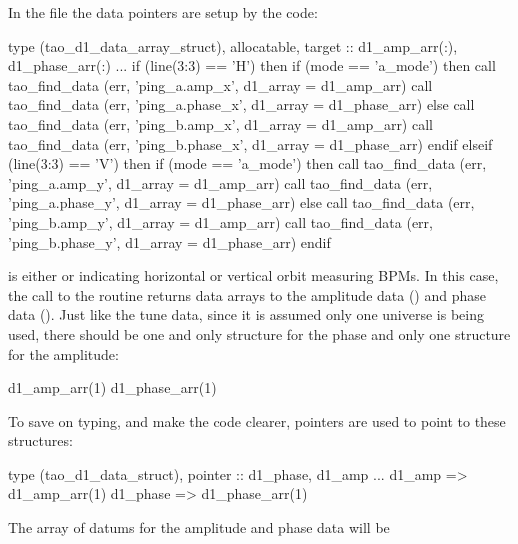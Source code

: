 {{{{{In the  file the data pointers are setup by the code:
\begin{example}
  type (tao_d1_data_array_struct), allocatable, target :: d1_amp_arr(:), d1_phase_arr(:)
  ...
  if (line(3:3) == 'H') then
    if (mode == 'a_mode') then
      call tao_find_data (err, 'ping_a.amp_x', d1_array = d1_amp_arr)
      call tao_find_data (err, 'ping_a.phase_x', d1_array = d1_phase_arr)
    else 
      call tao_find_data (err, 'ping_b.amp_x', d1_array = d1_amp_arr)
      call tao_find_data (err, 'ping_b.phase_x', d1_array = d1_phase_arr)
    endif
  elseif (line(3:3) == 'V') then
    if (mode == 'a_mode') then
      call tao_find_data (err, 'ping_a.amp_y', d1_array = d1_amp_arr)
      call tao_find_data (err, 'ping_a.phase_y', d1_array = d1_phase_arr)
    else 
      call tao_find_data (err, 'ping_b.amp_y', d1_array = d1_amp_arr)
      call tao_find_data (err, 'ping_b.phase_y', d1_array = d1_phase_arr)
    endif
\end{example}
 is either  or  indicating horizontal or vertical orbit measuring BPMs. In
this case, the call to the  routine returns  data arrays to the amplitude
data () and phase data ().  Just like the tune data, since it is
assumed only one universe is being used, there should be one and only  structure for the
phase and only one  structure for the amplitude:
\begin{example}
  d1_amp_arr(1)%
  d1_phase_arr(1)%
\end{example}
To save on typing, and make the code clearer, pointers are used to point to these structures:
\begin{example}
  type (tao_d1_data_struct), pointer :: d1_phase, d1_amp
  ...
  d1_amp => d1_amp_arr(1)%
  d1_phase => d1_phase_arr(1)%
\end{example}
The array of datums for the amplitude and phase data will be \vn{d1_amp%
\vn{d1_phase%

}}}}}}}
